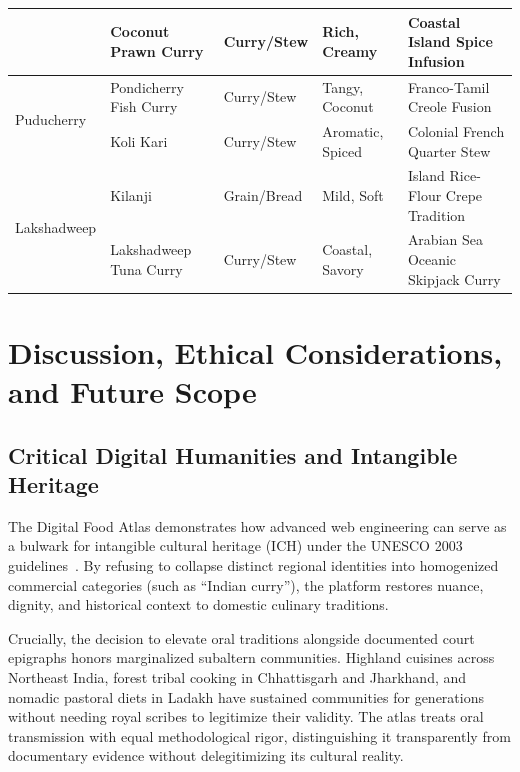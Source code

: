 \documentclass[11pt,a4paper]{report}
\begin{document}
\begin{small}
\begin{longtable}{llllp{4.2cm}}
        & Coconut Prawn Curry & Curry/Stew & Rich, Creamy & Coastal Island Spice Infusion \\
    \midrule
    \multirow{2}{*}{Puducherry}
        & Pondicherry Fish Curry & Curry/Stew & Tangy, Coconut & Franco-Tamil Creole Fusion \\
        & Koli Kari & Curry/Stew & Aromatic, Spiced & Colonial French Quarter Stew \\
    \midrule
    \multirow{2}{*}{Lakshadweep}
        & Kilanji & Grain/Bread & Mild, Soft & Island Rice-Flour Crepe Tradition \\
        & Lakshadweep Tuna Curry & Curry/Stew & Coastal, Savory & Arabian Sea Oceanic Skipjack Curry \\
\end{longtable}
\end{small}

\chapter{Discussion, Ethical Considerations, and Future Scope}

\section{Critical Digital Humanities and Intangible Heritage}
The Digital Food Atlas demonstrates how advanced web engineering can serve as a bulwark for intangible cultural heritage (ICH) under the UNESCO 2003 guidelines~\cite{unesco2003ich}. By refusing to collapse distinct regional identities into homogenized commercial categories (such as ``Indian curry''), the platform restores nuance, dignity, and historical context to domestic culinary traditions.

Crucially, the decision to elevate oral traditions alongside documented court epigraphs honors marginalized subaltern communities. Highland cuisines across Northeast India, forest tribal cooking in Chhattisgarh and Jharkhand, and nomadic pastoral diets in Ladakh have sustained communities for generations without needing royal scribes to legitimize their validity. The atlas treats oral transmission with equal methodological rigor, distinguishing it transparently from documentary evidence without delegitimizing its cultural reality.
\end{document}

